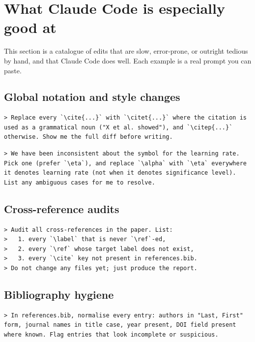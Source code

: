 \section{What Claude Code is especially good at}
\label{sec:strengths}

This section is a catalogue of edits that are slow, error-prone, or outright tedious by hand, and that Claude Code does well. Each example is a real prompt you can paste.

\subsection{Global notation and style changes}

\begin{lstlisting}[style=prompt]
> Replace every `\cite{...}` with `\citet{...}` where the citation is used as a grammatical noun ("X et al. showed"), and `\citep{...}` otherwise. Show me the full diff before writing.
\end{lstlisting}

\begin{lstlisting}[style=prompt]
> We have been inconsistent about the symbol for the learning rate. Pick one (prefer `\eta`), and replace `\alpha` with `\eta` everywhere it denotes learning rate (not when it denotes significance level). List any ambiguous cases for me to resolve.
\end{lstlisting}

\subsection{Cross-reference audits}

\begin{lstlisting}[style=prompt]
> Audit all cross-references in the paper. List:
>   1. every `\label` that is never `\ref`-ed,
>   2. every `\ref` whose target label does not exist,
>   3. every `\cite` key not present in references.bib.
> Do not change any files yet; just produce the report.
\end{lstlisting}

\subsection{Bibliography hygiene}

\begin{lstlisting}[style=prompt]
> In references.bib, normalise every entry: authors in "Last, First" form, journal names in title case, year present, DOI field present where known. Flag entries that look incomplete or suspicious.
\end{lstlisting}

